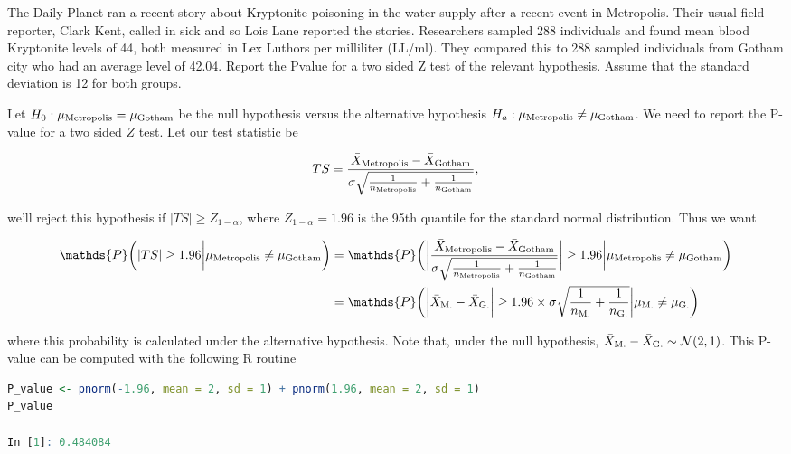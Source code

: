 \documentclass{homework}
\begin{document}
\begin{tcolorbox}[title=Question 9]
The Daily Planet ran a recent story about Kryptonite poisoning in the water supply after a recent event in Metropolis. Their usual field reporter, Clark Kent, called in sick and so Lois Lane reported the stories. Researchers sampled 288 individuals and found mean blood Kryptonite levels of 44, both measured in Lex Luthors per milliliter (LL/ml). They compared this to 288 sampled individuals from Gotham city who had an average level of 42.04. Report the Pvalue for a two sided Z test of the relevant hypothesis. Assume that the standard deviation is 12 for both groups.
\end{tcolorbox}

Let $H_0 : \mu_{\textnormal{Metropolis}} = \mu_{\textnormal{Gotham}}$ be the null hypothesis versus the alternative hypothesis $H_a : \mu_{\textnormal{Metropolis}} \neq \mu_{\textnormal{Gotham}}$. We need to report the P-value for a two sided $Z$ test. Let our test statistic be

$$
TS = \frac{\bar{X}_{\textnormal{Metropolis}} - \bar{X}_{\textnormal{Gotham}} }{\sigma\sqrt{\frac{1}{n_{\textnormal{Metropolis}}} + \frac{1}{n_{\textnormal{Gotham}}}}},
$$

we'll reject this hypothesis if $|TS| \geq Z_{1-\alpha}$, where $Z_{1-\alpha} = 1.96$ is the 95th quantile for the standard normal distribution. Thus we want

\begin{align*}
\mathds{P}\bigg(|TS| \geq 1.96 \bigg| \mu_{\textnormal{Metropolis}} \neq \mu_{\textnormal{Gotham}} \bigg) &= \mathds{P}\bigg(\bigg|\frac{\bar{X}_{\textnormal{Metropolis}} - \bar{X}_{\textnormal{Gotham}} }{\sigma\sqrt{\frac{1}{n_{\textnormal{Metropolis}}} + \frac{1}{n_{\textnormal{Gotham}}}}}\bigg| \geq 1.96 \bigg| \mu_{\textnormal{Metropolis}} \neq \mu_{\textnormal{Gotham}}\bigg) \\
&= \mathds{P}\bigg(\bigg|\bar{X}_{\textnormal{M.}} - \bar{X}_{\textnormal{G.}}\bigg| \geq 1.96 \times \sigma\sqrt{\frac{1}{n_{\textnormal{M.}}} + \frac{1}{n_{\textnormal{G.}}}} \bigg| \mu_{\textnormal{M.}} \neq \mu_{\textnormal{G.}}\bigg)
\end{align*}

where this probability is calculated under the alternative hypothesis. Note that, under the null hypothesis, $\bar{X}_{\textnormal{M.}} - \bar{X}_{\textnormal{G.}} \sim \mathcal{N}(2,1)$. This P-value can be computed with the following R routine

\begin{lstlisting}[language=R]
P_value <- pnorm(-1.96, mean = 2, sd = 1) + pnorm(1.96, mean = 2, sd = 1)
P_value 

In [1]: 0.484084
\end{lstlisting}
\end{document}
